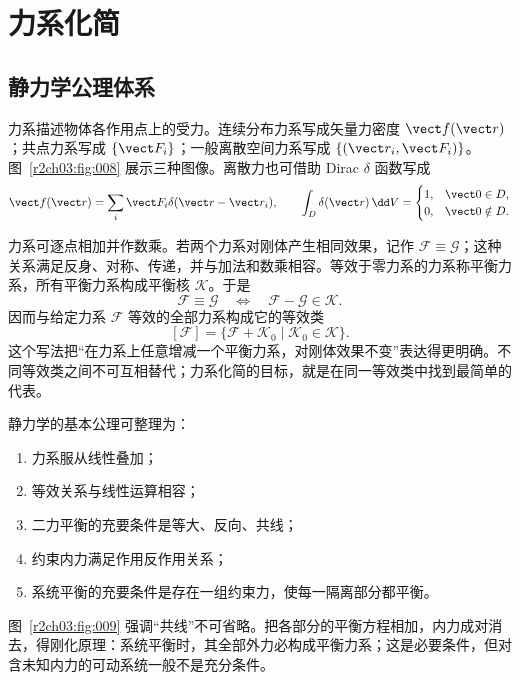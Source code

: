 \section{力系化简}
\label{r2ch03:sec:force-system}

\subsection{静力学公理体系}

力系描述物体各作用点上的受力。连续分布力系写成矢量力密度 $\vect f(\vect r)$；共点力系写成 $\{\vect F_i\}$；一般离散空间力系写成 $\{(\vect r_i,\vect F_i)\}$。图~\ref{r2ch03:fig:008} 展示三种图像。离散力也可借助 Dirac $\delta$ 函数写成
\begin{equation}
 \vect f(\vect r)=\sum_i\vect F_i\delta(\vect r-\vect r_i),\qquad
 \int_D\delta(\vect r)\,\dd V=
 \begin{cases}1,&\vect0\in D,\\0,&\vect0\notin D.\end{cases}
 \label{r2ch03:eq:010}
\end{equation}
\figForceSystemKinds

力系可逐点相加并作数乘。若两个力系对刚体产生相同效果，记作 $\mathcal F\equiv\mathcal G$；这种关系满足反身、对称、传递，并与加法和数乘相容。等效于零力系的力系称平衡力系，所有平衡力系构成平衡核 $\mathcal K$。于是
\begin{equation}
 \mathcal F\equiv\mathcal G
 \quad\Longleftrightarrow\quad
 \mathcal F-\mathcal G\in\mathcal K .
 \label{r2ch03:eq:011}
\end{equation}
因而与给定力系 $\mathcal F$ 等效的全部力系构成它的等效类
\[
 [\mathcal F]=\{\mathcal F+\mathcal K_0\mid \mathcal K_0\in\mathcal K\}.
\]
这个写法把“在力系上任意增减一个平衡力系，对刚体效果不变”表达得更明确。不同等效类之间不可互相替代；力系化简的目标，就是在同一等效类中找到最简单的代表。

静力学的基本公理可整理为：
\begin{enumerate}
 \item 力系服从线性叠加；
 \item 等效关系与线性运算相容；
 \item 二力平衡的充要条件是等大、反向、共线；
 \item 约束内力满足作用反作用关系；
 \item 系统平衡的充要条件是存在一组约束力，使每一隔离部分都平衡。
\end{enumerate}
图~\ref{r2ch03:fig:009} 强调“共线”不可省略。把各部分的平衡方程相加，内力成对消去，得刚化原理：系统平衡时，其全部外力必构成平衡力系；这是必要条件，但对含未知内力的可动系统一般不是充分条件。
\figActionReactionAxioms

